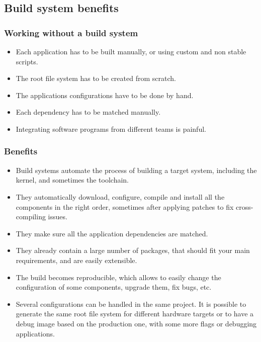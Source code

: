 \subsection{Build system benefits}

\begin{frame}
  \frametitle{Working without a build system}
  \begin{itemize}
    \item Each application has to be built manually, or using custom
          and non stable scripts.
    \item The root file system has to be created from scratch.
    \item The applications configurations have to be done by hand.
    \item Each dependency has to be matched manually.
    \item Integrating software programs from different teams is painful.
  \end{itemize}
\end{frame}

\begin{frame}
  \frametitle{Benefits}
  \begin{itemize}
    \item Build systems automate the process of building a target
      system, including the kernel, and sometimes the toolchain.
    \item They automatically download, configure, compile and install
      all the components in the right order, sometimes after applying
      patches to fix cross-compiling issues.
    \item They make sure all the application dependencies are matched.
    \item They already contain a large number of packages, that should
      fit your main requirements, and are easily extensible.
    \item The build becomes reproducible, which allows to easily
      change the configuration of some components, upgrade them, fix
      bugs, etc.
    \item Several configurations can be handled in the same project.
      It is possible to generate the same root file system for
      different hardware targets or to have a debug image based on the
      production one, with some more flags or debugging applications.
  \end{itemize}
\end{frame}

